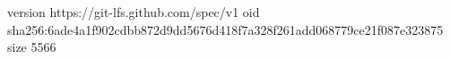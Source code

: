 version https://git-lfs.github.com/spec/v1
oid sha256:6ade4a1f902cdbb872d9dd5676d418f7a328f261add068779ce21f087e323875
size 5566
